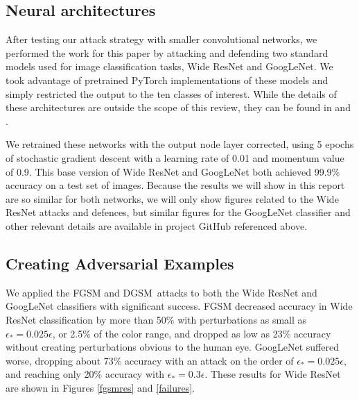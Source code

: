\documentclass[conference]{IEEEtran}
\begin{document}
\subsection{Neural architectures}

After testing our attack strategy with smaller convolutional networks, we
performed the work for this paper by attacking and defending two standard
models used for image classification tasks, Wide ResNet and GoogLeNet. We
took advantage of pretrained PyTorch implementations of these models and
simply restricted the output to the ten classes of interest. While the
details of these architectures are outside the scope of this review, they
can be found in \cite{zagoruyko2016wide} and \cite{szegedy2015going}.

We retrained these networks with the output node layer corrected, using 5
epochs of stochastic gradient descent with a learning rate of 0.01 and
momentum value of 0.9. This base version of Wide ResNet and GoogLeNet both
achieved 99.9\% accuracy on a test set of images. Because the results we
will show in this report are so similar for both networks, we will only show
figures related to the Wide ResNet attacks and defences, but similar figures
for the GoogLeNet classifier and other relevant details are available in
project GitHub referenced above.

\subsection{Creating Adversarial Examples}

We applied the FGSM and DGSM\ attacks to both the Wide ResNet and GoogLeNet
classifiers with significant success. FGSM decreased accuracy in Wide ResNet
classification by more than 50\% with perturbations as small as $\epsilon
_{\ast }=0.025\epsilon $, or 2.5\% of the color range, and dropped as low as
23\% accuracy without creating perturbations obvious to the human eye.
GoogLeNet suffered worse, dropping about 73\% accuracy with an attack on the
order of $\epsilon _{\ast }=0.025\epsilon ,$ and reaching only 20\% accuracy
with $\epsilon _{\ast }=0.3\epsilon .$ These results for Wide ResNet are
shown in Figures \ref{fgsmres} and \ref{failures}.  \bigskip 

\begin{figure*}[h]
\centering%
\texttt{[image: \{Plots/plots\_base/imagenette\_samples\_fgsm\_plots.jpg]}}
\caption{Results of an FGSM attack on the Wide ResNet classifier at various
small values of $\protect\epsilon _{\ast }$.}
\label{fgsmres}
\end{figure*}
\end{document}
